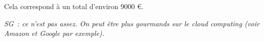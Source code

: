 \documentclass[a4paper, 10pt]{article}
\numberwithin{equation}{subsection}
\begin{document}
Cela correspond à un total d'environ 9000 €.

{\em SG~: ce n'est pas assez. On peut être plus gourmands sur le
cloud computing (voir Amazon et Google par exemple).}




\end{document}

